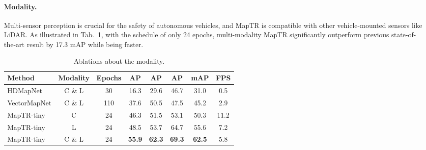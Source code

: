 \documentclass{article} \usepackage{iclr2023_conference,times}
\begin{document}
\begin{table}[h!]
\begin{center}
\end{center}
\vspace*{-0.45cm}
\caption{Ablations about Swin Transformer backbones.}
\label{tab:swin-backbones}
\vspace*{-0.35cm}
\end{table}


\paragraph{Modality.} Multi-sensor perception is crucial for the safety of autonomous vehicles, and MapTR is compatible with other vehicle-mounted sensors like LiDAR. As illustrated in Tab.~\ref{tab:modality}, with the schedule of only 24 epochs, multi-modality MapTR significantly outperform previous state-of-the-art result by 17.3 mAP while being  faster.

\begin{table}[ht!]
\begin{center}

\begin{tabular}{lcc|cccc|c}
\hline
\rowcolor{Gray}
Method & Modality & Epochs & AP & AP & AP & mAP & FPS \\
\toprule
HDMapNet & C \& L & 30 & 16.3 & 29.6 & 46.7 & 31.0 & 0.5\\
VectorMapNet & C \& L  & 110 & 37.6 & 50.5 & 47.5 & 45.2 & 2.9\\
\midrule
MapTR-tiny & C & 24 & \cellcolor{blue!10}46.3 & \cellcolor{blue!10}51.5 & \cellcolor{blue!10}53.1 & \cellcolor{blue!10}50.3& \cellcolor{blue!10}11.2\\
MapTR-tiny & L  &24 & 48.5 & 53.7  & 64.7 &55.6 &7.2\\
MapTR-tiny & C \& L  &24 & \textbf{55.9} & \textbf{62.3}  & \textbf{69.3} & \textbf{62.5} &5.8\\
\bottomrule
\end{tabular}

\end{center}
\vspace*{-0.45cm}
\caption{Ablations about the modality.}
\label{tab:modality}
\vspace*{-0.35cm}
\end{table}
\end{document}

